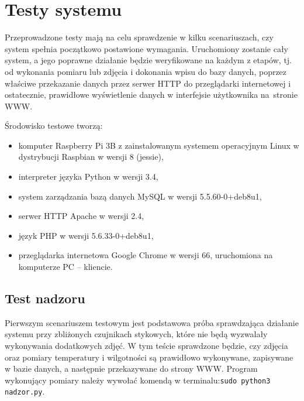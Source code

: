 \documentclass[a4paper,11pt,twoside]{article}
\begin{document}
\newpage
\section{Testy systemu}
Przeprowadzone testy mają na celu sprawdzenie w kilku scenariuszach, czy system spełnia początkowo postawione wymagania. Uruchomiony zostanie cały system, a jego poprawne działanie będzie weryfikowane na każdym z etapów, tj. od wykonania pomiaru lub zdjęcia i dokonania wpisu do bazy danych, poprzez właściwe przekazanie danych przez serwer HTTP do przeglądarki internetowej i ostatecznie, prawidłowe wyświetlenie danych w interfejsie użytkownika na~stronie WWW.

Środowisko testowe tworzą:
\begin{itemize}
\item komputer Raspberry Pi 3B z zainstalowanym systemem operacyjnym Linux w dystrybucji Raspbian w wersji 8 (jessie), 
\item interpreter języka Python w wersji 3.4,
\item system zarządzania bazą danych MySQL w wersji 5.5.60-0+deb8u1,
\item serwer HTTP Apache w wersji 2.4,
\item język PHP w wersji 5.6.33-0+deb8u1,
\item przeglądarka internetowa Google Chrome w wersji 66, uruchomiona na komputerze PC -- kliencie.
\end{itemize}

\subsection{Test nadzoru}
Pierwszym scenariuszem testowym jest podstawowa próba sprawdzająca działanie systemu przy zbliżonych czujnikach stykowych, które nie będą wyzwalały wykonywania dodatkowych zdjęć. W tym teście sprawdzone będzie, czy zdjęcia oraz pomiary temperatury i wilgotności są prawidłowo wykonywane, zapisywane w bazie danych, a następnie przekazywane do strony WWW. Program wykonujący pomiary należy wywołać komendą w terminalu:\linebreak\texttt{sudo python3 nadzor.py}.
\end{document}
